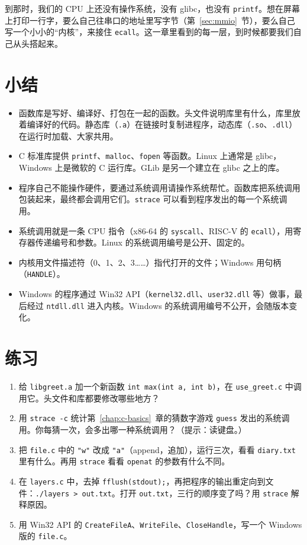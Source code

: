 到那时，我们的 CPU 上还没有操作系统，没有 glibc，也没有 \texttt{printf}。想在屏幕上打印一行字，要么自己往串口的地址里写字节（第~\ref{sec:mmio}~节），要么自己写一个小小的“内核”，来接住 \texttt{ecall}。这一章里看到的每一层，到时候都要我们自己从头搭起来。

\section{小结}

\begin{itemize}
  \item 函数库是写好、编译好、打包在一起的函数。头文件说明库里有什么，库里放着编译好的代码。静态库（\texttt{.a}）在链接时复制进程序，动态库（\texttt{.so}、\texttt{.dll}）在运行时加载、大家共用。
  \item C 标准库提供 \texttt{printf}、\texttt{malloc}、\texttt{fopen} 等函数。Linux 上通常是 glibc，Windows 上是微软的 C 运行库。GLib 是另一个建立在 glibc 之上的库。
  \item 程序自己不能操作硬件，要通过系统调用请操作系统帮忙。函数库把系统调用包装起来，最终都会调用它们。\texttt{strace} 可以看到程序发出的每一个系统调用。
  \item 系统调用就是一条 CPU 指令（x86-64 的 \texttt{syscall}、RISC-V 的 \texttt{ecall}），用寄存器传递编号和参数。Linux 的系统调用编号是公开、固定的。
  \item 内核用文件描述符（0、1、2、3……）指代打开的文件；Windows 用句柄（\texttt{HANDLE}）。
  \item Windows 的程序通过 Win32 API（\texttt{kernel32.dll}、\texttt{user32.dll} 等）做事，最后经过 \texttt{ntdll.dll} 进入内核。Windows 的系统调用编号不公开，会随版本变化。
\end{itemize}

\section*{练习}

\begin{enumerate}
  \item 给 \texttt{libgreet.a} 加一个新函数 \texttt{int max(int a, int b)}，在 \texttt{use\_greet.c} 中调用它。头文件和库都要修改哪些地方？
  \item 用 \texttt{strace -c} 统计第~\ref{chap:c-basics}~章的猜数字游戏 \texttt{guess} 发出的系统调用。你每猜一次，会多出哪一种系统调用？（提示：读键盘。）
  \item 把 \texttt{file.c} 中的 \texttt{"w"} 改成 \texttt{"a"}（append，追加），运行三次，看看 \texttt{diary.txt} 里有什么。再用 \texttt{strace} 看看 \texttt{openat} 的参数有什么不同。
  \item 在 \texttt{layers.c} 中，去掉 \texttt{fflush(stdout);}，再把程序的输出重定向到文件：\texttt{./layers > out.txt}。打开 \texttt{out.txt}，三行的顺序变了吗？用 \texttt{strace} 解释原因。
  \item 用 Win32 API 的 \texttt{CreateFileA}、\texttt{WriteFile}、\texttt{CloseHandle}，写一个 Windows 版的 \texttt{file.c}。
\end{enumerate}
